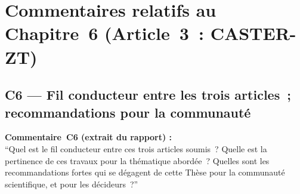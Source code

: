 \documentclass[12pt,a4paper]{article}
\newcommand{\Commentaire}[2]{%
  \begin{reviewerbox}
    \textbf{Commentaire~#1 (extrait du rapport) :}\\#2
  \end{reviewerbox}%
}
\begin{document}
\section*{Commentaires relatifs au Chapitre~6 (Article~3~: CASTER-ZT)}

\subsection*{C6 --- Fil conducteur entre les trois articles~; recommandations pour la communauté}

\Commentaire{C6}{
  ``Quel est le fil conducteur entre ces trois articles soumis~? Quelle est la pertinence de ces
  travaux pour la thématique abordée~? Quelles sont les recommandations fortes qui se dégagent de
  cette Thèse pour la communauté scientifique, et pour les décideurs~?''
}
\end{document}
